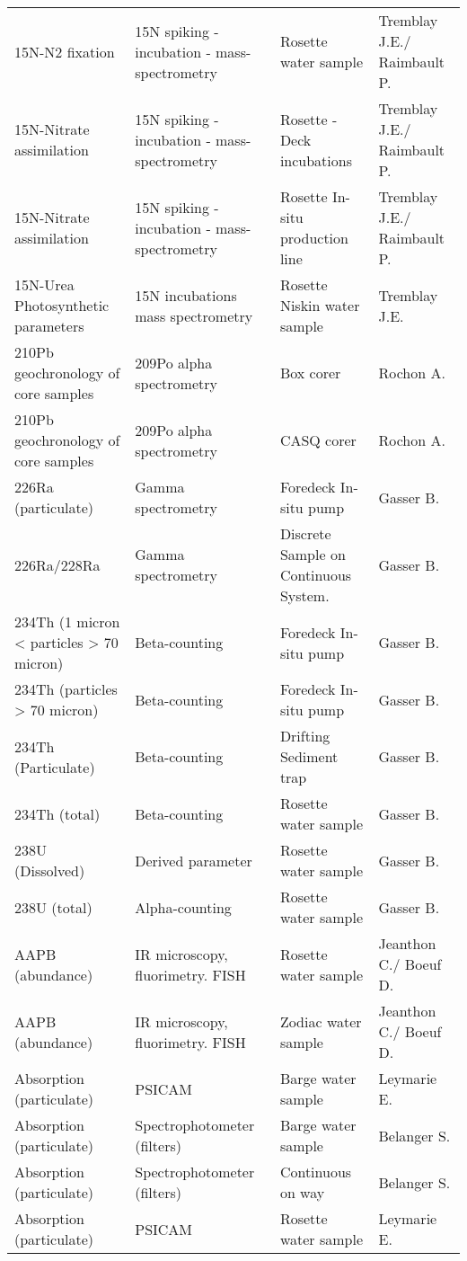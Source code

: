 \begin{landscape}
\begin{longtable}[t]{llll}
15N-N2 fixation & 15N spiking - incubation - mass-spectrometry & Rosette water sample & Tremblay J.E./ Raimbault P.\\
15N-Nitrate assimilation & 15N spiking - incubation - mass-spectrometry & Rosette - Deck incubations & Tremblay J.E./ Raimbault P.\\
15N-Nitrate assimilation & 15N spiking - incubation - mass-spectrometry & Rosette In-situ production line & Tremblay J.E./ Raimbault P.\\
15N-Urea Photosynthetic parameters & 15N incubations mass spectrometry & Rosette Niskin water sample & Tremblay J.E.\\
\addlinespace
210Pb geochronology of core samples & 209Po alpha spectrometry & Box corer & Rochon A.\\
210Pb geochronology of core samples & 209Po alpha spectrometry & CASQ corer & Rochon A.\\
226Ra (particulate) & Gamma spectrometry & Foredeck In-situ pump & Gasser B.\\
226Ra/228Ra & Gamma spectrometry & Discrete Sample on Continuous System. & Gasser B.\\
234Th (1 micron < particles > 70 micron) & Beta-counting & Foredeck In-situ pump & Gasser B.\\
\addlinespace
234Th (particles > 70 micron) & Beta-counting & Foredeck In-situ pump & Gasser B.\\
234Th (Particulate) & Beta-counting & Drifting Sediment trap & Gasser B.\\
234Th (total) & Beta-counting & Rosette water sample & Gasser B.\\
238U (Dissolved) & Derived parameter & Rosette water sample & Gasser B.\\
238U (total) & Alpha-counting & Rosette water sample & Gasser B.\\
\addlinespace
AAPB (abundance) & IR microscopy, fluorimetry. FISH & Rosette water sample & Jeanthon C./ Boeuf D.\\
AAPB (abundance) & IR microscopy, fluorimetry. FISH & Zodiac water sample & Jeanthon C./ Boeuf D.\\
Absorption (particulate) & PSICAM & Barge water sample & Leymarie E.\\
Absorption (particulate) & Spectrophotometer (filters) & Barge water sample & Belanger S.\\
Absorption (particulate) & Spectrophotometer (filters) & Continuous on way & Belanger S.\\
\addlinespace
Absorption (particulate) & PSICAM & Rosette water sample & Leymarie E.\\

\end{longtable}
\end{landscape}
